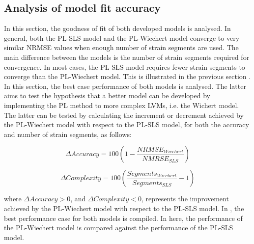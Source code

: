 \subsection{Analysis of model fit accuracy} \label{ModelfitAnalysis}

In this section, the goodness of fit of both developed models is analysed. In general, both the PL-SLS model and the PL-Wiechert model converge to very similar NRMSE values when enough number of strain segments are used. The main difference between the models is the number of strain segments required for convergence. In most cases, the PL-SLS model requires fewer strain segments to converge than the PL-Wiechert model. This is illustrated in the previous section . In this section, the best case performance of both models is analysed. The latter aims to test the hypothesis that a better model can be developed by implementing the PL method to more complex LVMs, i.e. the Wichert model. The latter can be tested by calculating the increment or decrement achieved by the PL-Wiechert model with respect to the PL-SLS model, for both the accuracy and number of strain segments, as follows:

\begin{equation}
	\Delta Accuracy = 100\left(1 - \frac{NRMSE_{Wiechert}}{NMRSE_{SLS}} \right)
\end{equation}

\begin{equation}
	\Delta Complexity = 100\left( \frac{Segments_{Wiechert}}{Segments_{SLS}} - 1 \right)
\end{equation}

\noindent where $\Delta Accuracy > 0$, and $\Delta Complexity < 0$, represents the improvement achieved by the PL-Wiechert model with respect to the PL-SLS model. In , the best performance case for both models is compiled. In here, the performance of the PL-Wiechert model is compared against the performance of the PL-SLS model.

